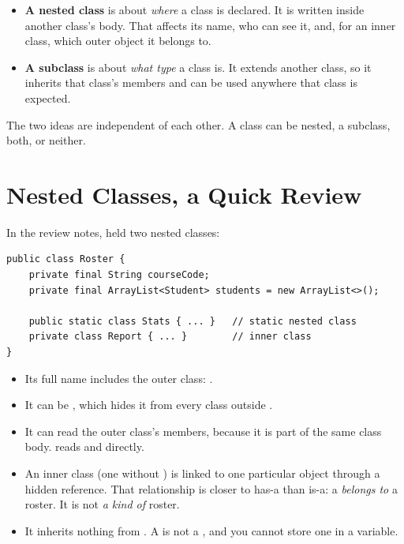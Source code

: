 \documentclass[11pt]{article}
\begin{document}
\begin{itemize}[leftmargin=1.4em]
  \item \textbf{A nested class} is about \emph{where} a class is declared. It is written inside
        another class's body. That affects its name, who can see it, and, for an inner class, which
        outer object it belongs to.
  \item \textbf{A subclass} is about \emph{what type} a class is. It extends another class, so it
        inherits that class's members and can be used anywhere that class is expected.
\end{itemize}

The two ideas are independent of each other. A class can be nested, a subclass, both, or neither.

\section{Nested Classes, a Quick Review}

In the review notes,  held two nested classes:

\begin{lstlisting}
public class Roster {
    private final String courseCode;
    private final ArrayList<Student> students = new ArrayList<>();

    public static class Stats { ... }   // static nested class
    private class Report { ... }        // inner class
}
\end{lstlisting}

\begin{itemize}[leftmargin=1.4em]
  \item Its full name includes the outer class: .
  \item It can be , which hides it from every class outside .
  \item It can read the outer class's  members, because it is part of the same class
        body.  reads  and  directly.
  \item An inner class (one without ) is linked to one particular  object
        through a hidden reference. That relationship is closer to has-a than is-a: a 
        \emph{belongs to} a roster. It is not \emph{a kind of} roster.
  \item It inherits nothing from . A  is not a , and you cannot
        store one in a  variable.
\end{itemize}
\end{document}
